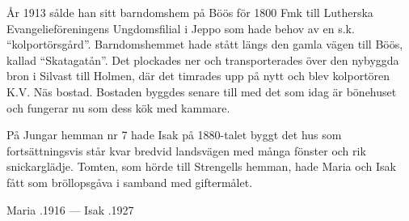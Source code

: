 År 1913 sålde han sitt barndomshem på Böös för 1800 Fmk till Lutherska Evangelieföreningens Ungdomsfilial i Jeppo som hade behov av en s.k. ``kolportörsgård''. Barndomshemmet hade stått längs den gamla vägen till Böös, kallad ``Skatagatån''. Det plockades ner och transporterades över den nybyggda bron i Silvast till Holmen, där det timrades upp på nytt och blev kolportören K.V. Näs bostad. Bostaden byggdes senare till med det som idag är bönehuset och fungerar nu som dess kök med kammare.

På Jungar hemman nr 7 hade Isak på 1880-talet byggt det hus som fortsättningsvis står kvar bredvid landsvägen med många fönster och rik snickarglädje. Tomten, som hörde till Strengells hemman, hade Maria och Isak fått som bröllopsgåva i samband med giftermålet.
\begin{jhchildren}
  \item {}
  \item {}
  \item {}
  \item {}
  \item {}
  \item {}
  \item {}
  \item {}
  \item {}
  \item {}
  \item {}
\end{jhchildren}

Maria .1916  ---  Isak .1927







